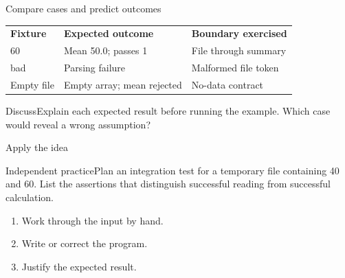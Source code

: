 \documentclass[10pt,aspectratio=169]{beamer}
\begin{document}
\begin{frame}[fragile,t]{Compare cases and predict outcomes}
\small\renewcommand{\arraystretch}{1.5}
\begin{tabularx}{\textwidth}{>{\raggedright\arraybackslash}X>{\raggedright\arraybackslash}X>{\raggedright\arraybackslash}X}\rowcolor{navy}
\color{white}\bfseries Fixture & \color{white}\bfseries Expected outcome & \color{white}\bfseries Boundary exercised\\
40 60 & Mean 50.0; passes 1 & File through summary\\
50 bad & Parsing failure & Malformed file token\\
Empty file & Empty array; mean rejected & No-data contract\\
\end{tabularx}\par\vspace{3mm}\begin{exampleblock}{Discuss}Explain each expected result before running the example. Which case would reveal a wrong assumption?\end{exampleblock}
\end{frame}

\begin{frame}[fragile,t]{Apply the idea}
\begin{alertblock}{Independent practice}Plan an integration test for a temporary file containing 40 and 60. List the assertions that distinguish successful reading from successful calculation.\end{alertblock}\vspace{3mm}\begin{enumerate}\item Work through the input by hand.\item Write or correct the program.\item Justify the expected result.\end{enumerate}
\end{frame}
\end{document}
